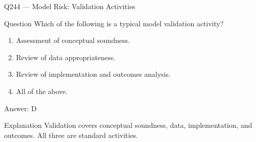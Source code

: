\documentclass[aspectratio=169,8pt]{beamer}
\begin{document}
																																																			\begin{frame}{Q244 --- Model Risk: Validation Activities}
																																																				\begin{block}{Question}
																																																					Which of the following is a typical model validation activity?
																																																					\begin{enumerate}
																																																						\item Assessment of conceptual soundness.
																																																						\item Review of data appropriateness.
																																																						\item Review of implementation and outcomes analysis.
																																																						\item All of the above.
																																																					\end{enumerate}  \end{block}
																																																					\begin{exampleblock}{Answer: D}\end{exampleblock}
																																																					\begin{block}{Explanation}
																																																						Validation covers conceptual soundness, data, implementation, and outcomes. All three are standard activities.
																																																					\end{block}
																																																				\end{frame}
																																																				
\end{document}
